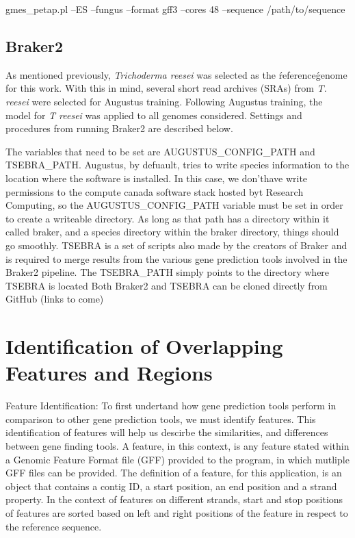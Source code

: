 gmes\_petap.pl --ES --fungus
--format gff3 --cores 48 --sequence /path/to/sequence

\subsection{Braker2}

As mentioned previously, \textit{Trichoderma reesei} was selected as
the \'reference\' genome for this work. With this in mind, several
short read archives (SRAs) from \textit{T. reesei} were selected for
Augustus training. Following Augustus training, the model for
\textit{T reesei} was applied to all genomes considered. Settings and
procedures from running Braker2 are described below.

The variables that need to be set are AUGUSTUS\_CONFIG\_PATH and
TSEBRA\_PATH. Augustus, by defuault, tries to write species
information to the location where the software is installed. In this
case, we don'thave write permissions to the compute canada software
stack hosted byt Research Computing, so the AUGUSTUS\_CONFIG\_PATH
variable must be set in order to create a writeable directory. As long
as that path has a directory within it called braker, and a species
directory within the braker directory, things should go
smoothly. TSEBRA is a set of scripts also made by the creators of
Braker and is required to merge results from the various gene
prediction tools involved in the Braker2 pipeline. The TSEBRA\_PATH
simply points to the directory where TSEBRA is located Both Braker2
and TSEBRA can be cloned directly from GitHub (links to come)

\section{Identification of Overlapping Features and Regions}

Feature Identification: To first undertand how gene prediction tools
perform in comparison to other gene prediction tools, we must identify
features. This identification of features will help us descirbe the
similarities, and differences between gene finding tools. A feature,
in this context, is any feature stated within a Genomic Feature Format
file (GFF) provided to the program, in which mutliple GFF files can be
provided. The definition of a feature, for this application, is an
object that contains a contig ID, a start position, an end position
and a strand property. In the context of features on different
strands, start and stop positions of features are sorted based on left
and right positions of the feature in respect to the reference
sequence.

